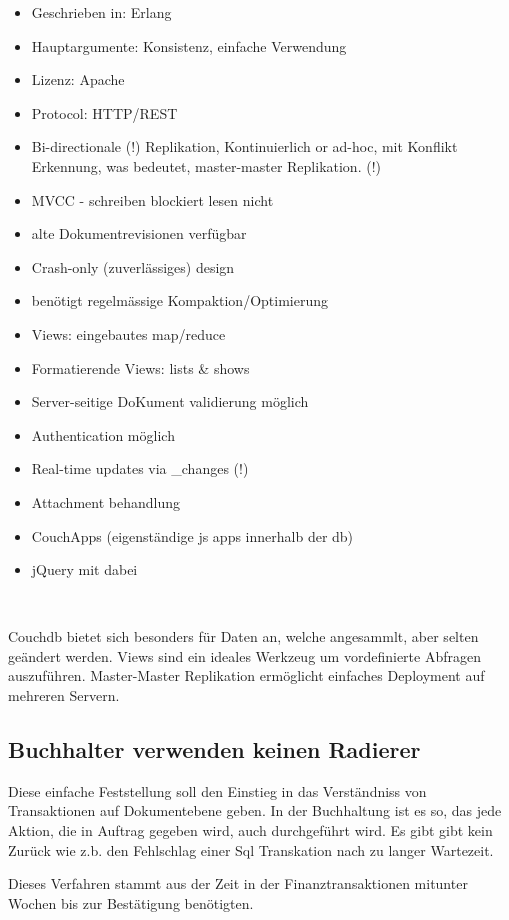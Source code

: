 \begin{itemize}
\item Geschrieben in: Erlang
\item Hauptargumente: Konsistenz, einfache Verwendung
\item Lizenz: Apache
\item Protocol: HTTP/REST
\item Bi-directionale (!) Replikation,
    Kontinuierlich or ad-hoc,
    mit Konflikt Erkennung,
    was bedeutet, master-master Replikation. (!)

\item MVCC - schreiben blockiert lesen nicht
\item alte Dokumentrevisionen verfügbar
\item Crash-only (zuverlässiges) design
\item benötigt regelmässige Kompaktion/Optimierung
\item Views: eingebautes map/reduce
\item Formatierende Views: lists \& shows
\item Server-seitige DoKument validierung möglich
\item Authentication möglich
\item Real-time updates via \_changes (!)
\item Attachment behandlung
\item CouchApps (eigenständige js apps innerhalb der db)
\item jQuery mit dabei
\end{itemize}
~ \cite{web:db-compare}


Couchdb bietet sich besonders für Daten an, welche angesammlt, aber selten geändert werden.
Views sind ein ideales Werkzeug um vordefinierte Abfragen auszuführen.
Master-Master Replikation ermöglicht einfaches Deployment auf mehreren Servern.


\subsection{Buchhalter verwenden keinen Radierer}

Diese einfache Feststellung soll den Einstieg in das Verständniss von Transaktionen auf Dokumentebene geben.
In der Buchhaltung ist es so, das jede Aktion, die in Auftrag gegeben wird, auch durchgeführt wird.
Es gibt gibt kein Zurück wie z.b. den Fehlschlag einer Sql Transkation nach zu langer Wartezeit.

Dieses Verfahren stammt aus der Zeit in der Finanztransaktionen  mitunter Wochen bis zur Best\"atigung ben\"otigten.


